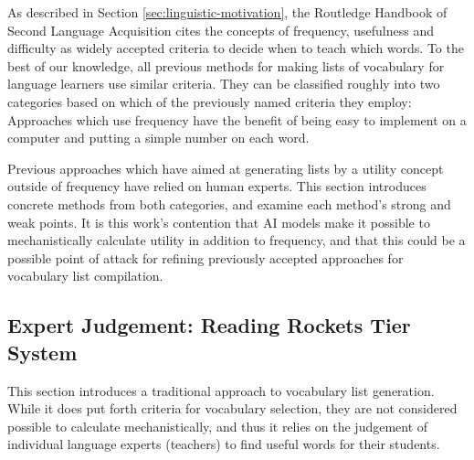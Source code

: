 As described in Section \ref{sec:linguistic-motivation}, the Routledge Handbook of Second Language Acquisition cites the concepts of frequency, usefulness and difficulty as widely accepted criteria to decide when to teach which words.
To the best of our knowledge, all previous methods for making lists of vocabulary for language learners use similar criteria.
They can be classified roughly into two categories based on which of the previously named criteria they employ:
Approaches which use frequency have the benefit of being easy to implement on a computer and putting a simple number on each word.

Previous approaches which have aimed at generating lists by a utility concept outside of frequency have relied on human experts.
This section introduces concrete methods from both categories, and examine each method's strong and weak points.
It is this work's contention that AI models make it possible to mechanistically calculate utility in addition to frequency, and that this could be a possible point of attack for refining previously accepted approaches for vocabulary list compilation.



\subsection{Expert Judgement: Reading Rockets Tier System}
This section introduces a traditional approach to vocabulary list generation.
While it does put forth criteria for vocabulary selection, they are not considered possible to calculate mechanistically, and thus it relies on the judgement of individual language experts (teachers) to find useful words for their students.

